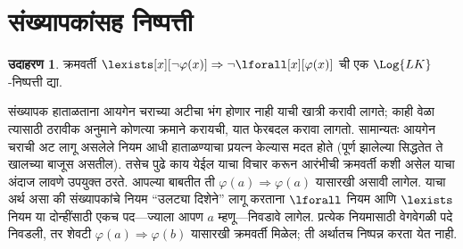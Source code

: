 \documentclass[11pt,a4paper,openany]{book}
\theoremstyle{definition}
\newtheorem{ex}[defn]{उदाहरण}
\newcommand{\Sequent}{\Rightarrow}
\begin{document}
\section{संख्यापकांसह निष्पत्ती}\label{fol:seq:prq:sec}

\begin{ex}
क्रमवर्ती $\lexists[x][\lnot \varphi(x)]
\Sequent \lnot \lforall[x][\varphi(x)]$ ची एक $\Log{LK}$-निष्पत्ती द्या.

संख्यापक हाताळताना आयगेन चराच्या अटीचा भंग होणार नाही याची खात्री करावी
लागते; काही वेळा त्यासाठी ठरावीक अनुमाने कोणत्या क्रमाने करायची, यात फेरबदल
करावा लागतो. सामान्यतः आयगेन चराची अट लागू असलेले नियम आधी हाताळण्याचा
प्रयत्न केल्यास मदत होते (पूर्ण झालेल्या सिद्धतेत ते खालच्या बाजूस असतील).
तसेच पुढे काय येईल याचा विचार करून आरंभीची क्रमवर्ती कशी असेल याचा अंदाज
लावणे उपयुक्त ठरते. आपल्या बाबतीत ती $\varphi(a) \Sequent \varphi(a)$ यासारखी असावी
लागेल. याचा अर्थ असा की संख्यापकांचे नियम ``उलट्या दिशेने'' लागू करताना
$\lforall$ नियम आणि $\lexists$ नियम या दोन्हींसाठी एकच पद---ज्याला आपण $a$
म्हणू---निवडावे लागेल. प्रत्येक नियमासाठी वेगवेगळी पदे निवडली, तर शेवटी
$\varphi(a) \Sequent \varphi(b)$ यासारखी क्रमवर्ती मिळेल; ती अर्थातच निष्पन्न करता
येत नाही.


\end{ex}
\end{document}

